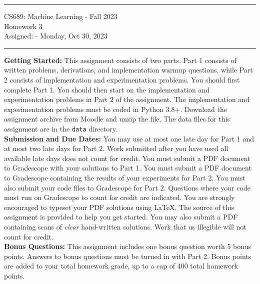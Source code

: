 \documentclass[11pt]{article}
\begin{document}
{\centering
  \rule{6.3in}{2pt}
  \vspace{1em}
  {\Large
    CS689: Machine Learning - Fall 2023\\
    Homework 3\\
  }
  \vspace{1em}
  Assigned: - Monday, Oct 30, 2023\\
  \vspace{0.1em}
  \rule{6.3in}{1.5pt}
}
\vspace{1pc}



\textbf{Getting Started:} This assignment consists of two parts. Part 1 consists of written problems, derivations, and implementation warmup questions, while Part 2 consists of implementation and experimentation problems. You should first complete Part 1. You should then start on the implementation and experimentation problems in Part 2 of the assignment. The implementation and experimentation problems must be coded in Python 3.8+. Download the assignment archive from Moodle and unzip the file. The data files for this assignment are in the \verb|data| directory.\\

\textbf{Submission and Due Dates:} You may use at most one late day for Part 1 and at most two late days for Part 2. Work submitted after you have used all available late days does not count for credit. You must submit a PDF document to Gradescope with your solutions to Part 1. You must submit a PDF document to Gradescope containing the results of your experiments for Part 2. You must also submit your code files to Gradescope for Part 2. Questions where your code must run on Gradescope to count for credit are indicated. You are strongly encouraged to typeset your PDF solutions using LaTeX. The source of this assignment is provided to help you get started. You may also submit a PDF containing scans of \textit{clear} hand-written solutions. Work that us illegible will not count for credit.\\

\textbf{Bonus Questions:} This assignment includes one bonus question worth 5 bonus points. Answers to bonus questions must be turned in with Part 2. Bonus points are added to your total homework grade, up to a cap of 400 total homework points.\\ 
\end{document}
